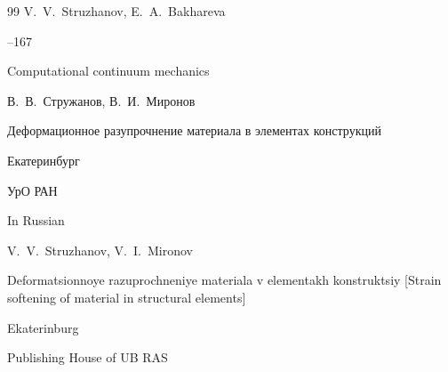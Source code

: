 \begin{thebibliography}{99}
\by V.~V.~Struzhanov, E.~A.~Bakhareva




--167

\jour Computational continuum mechanics

























\by В.~В.~Стружанов, В.~И.~Миронов

\book Деформационное разупрочнение материала в элементах конструкций

\publaddr Екатеринбург

\publ УрО РАН



\misctransl

\lang In Russian

\by V.~V.~Struzhanov, V.~I.~Mironov

\book Deformatsionnoye razuprochneniye materiala v elementakh konstruktsiy \rm [Strain softening of material in structural elements]

\publaddr Ekaterinburg

\publ Publishing House of UB RAS


\end{thebibliography}
